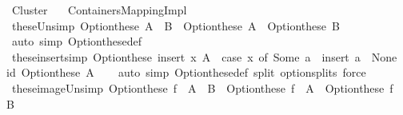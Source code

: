 %
\begin{isabellebody}%
%
%
\isadelimtheory
%
\endisadelimtheory
%
\isatagtheory
{}\isamarkupfalse%
\ Cluster\isanewline
\ \ \ {\isachardoublequoteopen}Containers{\isachardot}{\kern0pt}Mapping{\isacharunderscore}{\kern0pt}Impl{\isachardoublequoteclose}\isanewline
{}%
\endisatagtheory
{\isafoldtheory}%
%
\isadelimtheory
\isanewline
%
\endisadelimtheory
\isanewline
{}\isamarkupfalse%
\ these{\isacharunderscore}{\kern0pt}Un{\isacharbrackleft}{\kern0pt}simp{\isacharbrackright}{\kern0pt}{\isacharcolon}{\kern0pt}\ {\isachardoublequoteopen}Option{\isachardot}{\kern0pt}these\ {\isacharparenleft}{\kern0pt}A\ {\isasymunion}\ B{\isacharparenright}{\kern0pt}\ {\isacharequal}{\kern0pt}\ Option{\isachardot}{\kern0pt}these\ A\ {\isasymunion}\ Option{\isachardot}{\kern0pt}these\ B{\isachardoublequoteclose}\isanewline
%
\isadelimproof
\ \ %
\endisadelimproof
%
\isatagproof
{}\isamarkupfalse%
\ {\isacharparenleft}{\kern0pt}auto\ simp{\isacharcolon}{\kern0pt}\ Option{\isachardot}{\kern0pt}these{\isacharunderscore}{\kern0pt}def{\isacharparenright}{\kern0pt}%
\endisatagproof
{\isafoldproof}%
%
\isadelimproof
\isanewline
%
\endisadelimproof
\isanewline
{}\isamarkupfalse%
\ these{\isacharunderscore}{\kern0pt}insert{\isacharbrackleft}{\kern0pt}simp{\isacharbrackright}{\kern0pt}{\isacharcolon}{\kern0pt}\ {\isachardoublequoteopen}Option{\isachardot}{\kern0pt}these\ {\isacharparenleft}{\kern0pt}insert\ x\ A{\isacharparenright}{\kern0pt}\ {\isacharequal}{\kern0pt}\ {\isacharparenleft}{\kern0pt}case\ x\ of\ Some\ a\ {\isasymRightarrow}\ insert\ a\ {\isacharbar}{\kern0pt}\ None\ {\isasymRightarrow}\ id{\isacharparenright}{\kern0pt}\ {\isacharparenleft}{\kern0pt}Option{\isachardot}{\kern0pt}these\ A{\isacharparenright}{\kern0pt}{\isachardoublequoteclose}\isanewline
%
\isadelimproof
\ \ %
\endisadelimproof
%
\isatagproof
{}\isamarkupfalse%
\ {\isacharparenleft}{\kern0pt}auto\ simp{\isacharcolon}{\kern0pt}\ Option{\isachardot}{\kern0pt}these{\isacharunderscore}{\kern0pt}def\ split{\isacharcolon}{\kern0pt}\ option{\isachardot}{\kern0pt}splits{\isacharparenright}{\kern0pt}\ force%
\endisatagproof
{\isafoldproof}%
%
\isadelimproof
\isanewline
%
\endisadelimproof
\isanewline
{}\isamarkupfalse%
\ these{\isacharunderscore}{\kern0pt}image{\isacharunderscore}{\kern0pt}Un{\isacharbrackleft}{\kern0pt}simp{\isacharbrackright}{\kern0pt}{\isacharcolon}{\kern0pt}\ {\isachardoublequoteopen}Option{\isachardot}{\kern0pt}these\ {\isacharparenleft}{\kern0pt}f\ {\isacharbackquote}{\kern0pt}\ {\isacharparenleft}{\kern0pt}A\ {\isasymunion}\ B{\isacharparenright}{\kern0pt}{\isacharparenright}{\kern0pt}\ {\isacharequal}{\kern0pt}\ Option{\isachardot}{\kern0pt}these\ {\isacharparenleft}{\kern0pt}f\ {\isacharbackquote}{\kern0pt}\ A{\isacharparenright}{\kern0pt}\ {\isasymunion}\ Option{\isachardot}{\kern0pt}these\ {\isacharparenleft}{\kern0pt}f\ {\isacharbackquote}{\kern0pt}\ B{\isacharparenright}{\kern0pt}{\isachardoublequoteclose}\isanewline

\end{isabellebody}
